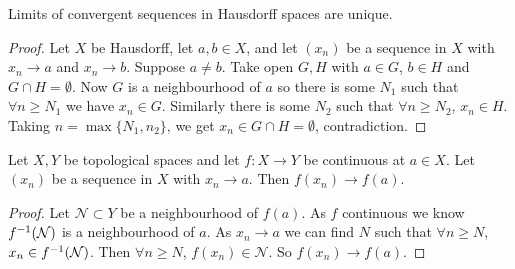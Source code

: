 \begin{proposition}                        %
Limits of convergent sequences in Hausdorff spaces are unique.
\end{proposition}          
\begin{proof}
Let $X$ be Hausdorff, let $a,b\in X$, and let $(x_n)$ be a sequence in $X$ with $x_n \to a$ and $x_n \to b$. Suppose $a\neq b$. Take open $G,H$ with $a\in G$, $b\in H$ and $G\cap H = \emptyset$. Now $G$ is a neighbourhood of $a$ so there is some $N_1$ such that $\forall n \geq N_1$ we have $x_n\in G$. Similarly there is some $N_2$ such that $\forall n \geq N_2$, $x_n\in H$. Taking $n = \max\{N_1,n_2\}$, we get $x_n\in G\cap H = \emptyset$, contradiction.
\end{proof}

\begin{proposition}          %
Let $X,Y$ be topological spaces and let $f:X \to Y$ be continuous at $a\in X$. Let $(x_n)$ be a sequence in $X$ with $x_n \to a$. Then $f(x_n) \to f(a)$.
\end{proposition}
\begin{proof}
Let $\mathcal{N}\subset Y$ be a neighbourhood of $f(a)$. As $f$ continuous we know $f^{-1} (\mathcal{N})$ is a neighbourhood of $a$. As $x_n \to a$ we can find $N$ such that $\forall n \geq N$, $x_n\in f^{-1}(\mathcal{N})$. Then $\forall n \geq N$, $f(x_n)\in \mathcal{N}$. So $f(x_n) \to f(a)$.
\end{proof}

